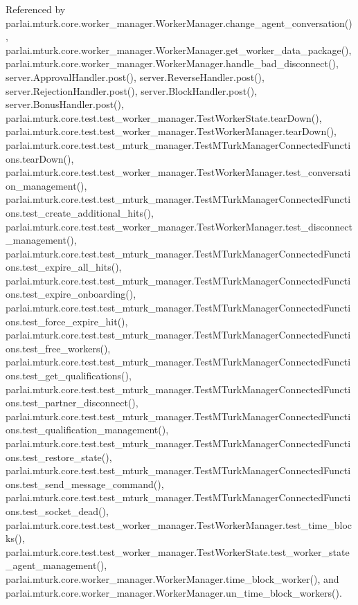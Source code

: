 Referenced by parlai.\+mturk.\+core.\+worker\+\_\+manager.\+Worker\+Manager.\+change\+\_\+agent\+\_\+conversation(), parlai.\+mturk.\+core.\+worker\+\_\+manager.\+Worker\+Manager.\+get\+\_\+worker\+\_\+data\+\_\+package(), parlai.\+mturk.\+core.\+worker\+\_\+manager.\+Worker\+Manager.\+handle\+\_\+bad\+\_\+disconnect(), server.\+Approval\+Handler.\+post(), server.\+Reverse\+Handler.\+post(), server.\+Rejection\+Handler.\+post(), server.\+Block\+Handler.\+post(), server.\+Bonus\+Handler.\+post(), parlai.\+mturk.\+core.\+test.\+test\+\_\+worker\+\_\+manager.\+Test\+Worker\+State.\+tear\+Down(), parlai.\+mturk.\+core.\+test.\+test\+\_\+worker\+\_\+manager.\+Test\+Worker\+Manager.\+tear\+Down(), parlai.\+mturk.\+core.\+test.\+test\+\_\+mturk\+\_\+manager.\+Test\+M\+Turk\+Manager\+Connected\+Functions.\+tear\+Down(), parlai.\+mturk.\+core.\+test.\+test\+\_\+worker\+\_\+manager.\+Test\+Worker\+Manager.\+test\+\_\+conversation\+\_\+management(), parlai.\+mturk.\+core.\+test.\+test\+\_\+mturk\+\_\+manager.\+Test\+M\+Turk\+Manager\+Connected\+Functions.\+test\+\_\+create\+\_\+additional\+\_\+hits(), parlai.\+mturk.\+core.\+test.\+test\+\_\+worker\+\_\+manager.\+Test\+Worker\+Manager.\+test\+\_\+disconnect\+\_\+management(), parlai.\+mturk.\+core.\+test.\+test\+\_\+mturk\+\_\+manager.\+Test\+M\+Turk\+Manager\+Connected\+Functions.\+test\+\_\+expire\+\_\+all\+\_\+hits(), parlai.\+mturk.\+core.\+test.\+test\+\_\+mturk\+\_\+manager.\+Test\+M\+Turk\+Manager\+Connected\+Functions.\+test\+\_\+expire\+\_\+onboarding(), parlai.\+mturk.\+core.\+test.\+test\+\_\+mturk\+\_\+manager.\+Test\+M\+Turk\+Manager\+Connected\+Functions.\+test\+\_\+force\+\_\+expire\+\_\+hit(), parlai.\+mturk.\+core.\+test.\+test\+\_\+mturk\+\_\+manager.\+Test\+M\+Turk\+Manager\+Connected\+Functions.\+test\+\_\+free\+\_\+workers(), parlai.\+mturk.\+core.\+test.\+test\+\_\+mturk\+\_\+manager.\+Test\+M\+Turk\+Manager\+Connected\+Functions.\+test\+\_\+get\+\_\+qualifications(), parlai.\+mturk.\+core.\+test.\+test\+\_\+mturk\+\_\+manager.\+Test\+M\+Turk\+Manager\+Connected\+Functions.\+test\+\_\+partner\+\_\+disconnect(), parlai.\+mturk.\+core.\+test.\+test\+\_\+mturk\+\_\+manager.\+Test\+M\+Turk\+Manager\+Connected\+Functions.\+test\+\_\+qualification\+\_\+management(), parlai.\+mturk.\+core.\+test.\+test\+\_\+mturk\+\_\+manager.\+Test\+M\+Turk\+Manager\+Connected\+Functions.\+test\+\_\+restore\+\_\+state(), parlai.\+mturk.\+core.\+test.\+test\+\_\+mturk\+\_\+manager.\+Test\+M\+Turk\+Manager\+Connected\+Functions.\+test\+\_\+send\+\_\+message\+\_\+command(), parlai.\+mturk.\+core.\+test.\+test\+\_\+mturk\+\_\+manager.\+Test\+M\+Turk\+Manager\+Connected\+Functions.\+test\+\_\+socket\+\_\+dead(), parlai.\+mturk.\+core.\+test.\+test\+\_\+worker\+\_\+manager.\+Test\+Worker\+Manager.\+test\+\_\+time\+\_\+blocks(), parlai.\+mturk.\+core.\+test.\+test\+\_\+worker\+\_\+manager.\+Test\+Worker\+State.\+test\+\_\+worker\+\_\+state\+\_\+agent\+\_\+management(), parlai.\+mturk.\+core.\+worker\+\_\+manager.\+Worker\+Manager.\+time\+\_\+block\+\_\+worker(), and parlai.\+mturk.\+core.\+worker\+\_\+manager.\+Worker\+Manager.\+un\+\_\+time\+\_\+block\+\_\+workers().

